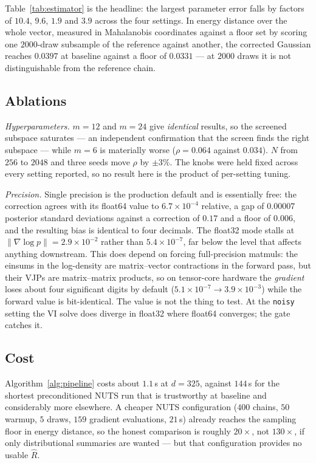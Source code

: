 \documentclass[11pt]{article}
\newcommand{\code}[1]{\texttt{\small #1}}
\newcommand{\Rhat}{\widehat{R}}
\theoremstyle{plain}
\theoremstyle{definition}
\theoremstyle{remark}
\begin{document}
Table~\ref{tab:estimator} is the headline: the largest parameter error falls by factors of $10.4$,
$9.6$, $1.9$ and $3.9$ across the four settings. In energy distance over the whole vector, measured
in Mahalanobis coordinates against a floor set by scoring one $2000$-draw subsample of the reference
against another, the corrected Gaussian reaches $0.0397$ at baseline against a floor of $0.0331$ ---
at $2000$ draws it is not distinguishable from the reference chain.

\subsection{Ablations}

\emph{Hyperparameters.} $m = 12$ and $m = 24$ give \emph{identical} results, so the screened
subspace saturates --- an independent confirmation that the screen finds the right subspace --- while
$m=6$ is materially worse ($\rho = 0.064$ against $0.034$). $N$ from $256$ to $2048$ and three seeds
move $\rho$ by $\pm3\%$. The knobs were held fixed across every setting reported, so no result here
is the product of per-setting tuning.

\emph{Precision.} Single precision is the production default and is essentially free: the
correction agrees with its float64 value to $6.7\times10^{-4}$ relative, a gap of $0.00007$ posterior
standard deviations against a correction of $0.17$ and a floor of $0.006$, and the resulting bias is
identical to four decimals. The float32 mode stalls at $\|\nabla\log p\| = 2.9\times10^{-2}$ rather
than $5.4\times10^{-7}$, far below the level that affects anything downstream. This does depend on
forcing full-precision matmuls: the einsums in the log-density are matrix--vector contractions in
the forward pass, but their VJPs are matrix--matrix products, so on tensor-core hardware the
\emph{gradient} loses about four significant digits by default ($5.1\times10^{-7} \to 3.9\times10^{-3}$)
while the forward value is bit-identical. The value is not the thing to test. At the \code{noisy}
setting the VI solve does diverge in float32 where float64 converges; the gate catches it.

\subsection{Cost}

Algorithm~\ref{alg:pipeline} costs about $1.1$\,s at $d = 325$, against $144$\,s for the shortest
preconditioned NUTS run that is trustworthy at baseline and considerably more elsewhere. A cheaper
NUTS configuration ($400$ chains, $50$ warmup, $5$ draws, $159$ gradient evaluations, $21$\,s)
already reaches the sampling floor in energy distance, so the honest comparison is roughly
$20\times$, not $130\times$, if only distributional summaries are wanted --- but that configuration
provides no usable $\Rhat$.
\end{document}
